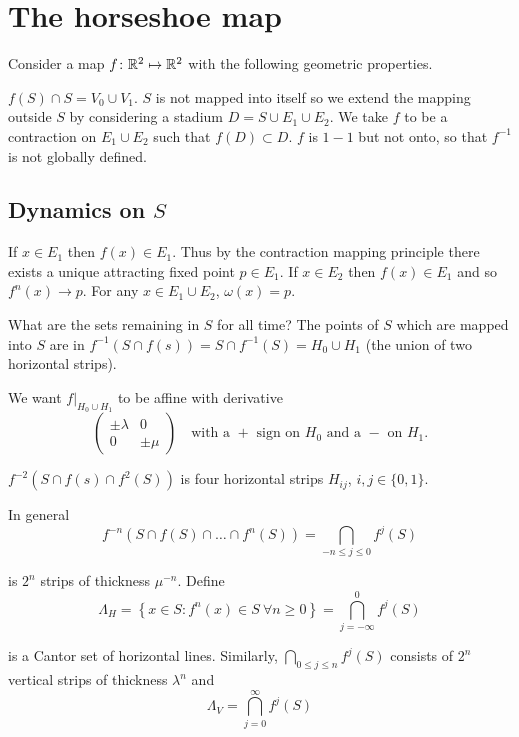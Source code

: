 \documentclass{notes}
\theoremstyle{plain}
\begin{document}
\section{The horseshoe map}

Consider a map $f \colon \mathbb{R}^2 \mapsto \mathbb{R}^2$ with the following geometric
properties.

\vspace{2in}

$f(S) \cap S = V_0 \cup V_1$.  $S$ is not mapped into itself so we
extend the mapping outside $S$ by considering a stadium $D = S \cup
E_1 \cup E_2$.  We take $f$ to be a contraction on $E_1 \cup E_2$ such
that $f(D) \subset D$.  $f$ is $1-1$ but not onto, so that $f^{-1}$ is
not globally defined.

\subsection{Dynamics on $S$}

If $x \in E_1$ then $f(x) \in E_1$.  Thus by the contraction mapping
principle there exists a unique attracting fixed point $p \in E_1$.
If $x \in E_2$ then $f(x) \in E_1$ and so $f^n(x) \to p$.  For any $x
\in E_1 \cup E_2$, $\omega(x) = p$.

What are the sets remaining in $S$ for all time?  The points of $S$
which are mapped into $S$ are in $f^{-1}(S \cap f(s)) = S \cap
f^{-1}(S) = H_0 \cup H_1$ (the union of two horizontal strips).

\vspace{1.5in}

We want $\left. f\right|_{H_0 \cup H_1}$ to be affine with
derivative
\[
\begin{pmatrix}
\pm \lambda & 0 \\ 0 & \pm \mu
\end{pmatrix} \quad
\text{with a $+$ sign on $H_0$ and a $-$ on $H_1$.}
\]

$f^{-2}(S \cap f(s) \cap f^2(S) )$ is four horizontal strips
$H_{ij}$, $i,j \in \{0,1\}$.

\vspace{2in}

In general
\[
f^{-n}(S \cap f(S) \cap \dots \cap f^n(S)) = \bigcap_{-n \le j \le 0}
f^j(S)
\]

is $2^n$ strips of thickness $\mu^{-n}$.  Define
\[
\Lambda_H = \left\{ x \in S : f^n(x) \in S\ \forall n \ge 0 \right\}
= \bigcap_{j=-\infty}^0 f^j(S)
\]

is a Cantor set of horizontal lines.  Similarly,
$\bigcap_{0 \le j \le n} f^j(S)$ consists of $2^n$ vertical strips
of thickness $\lambda^n$ and
\[
\Lambda_V = \bigcap_{j=0}^\infty f^j(S)
\]
\end{document}
